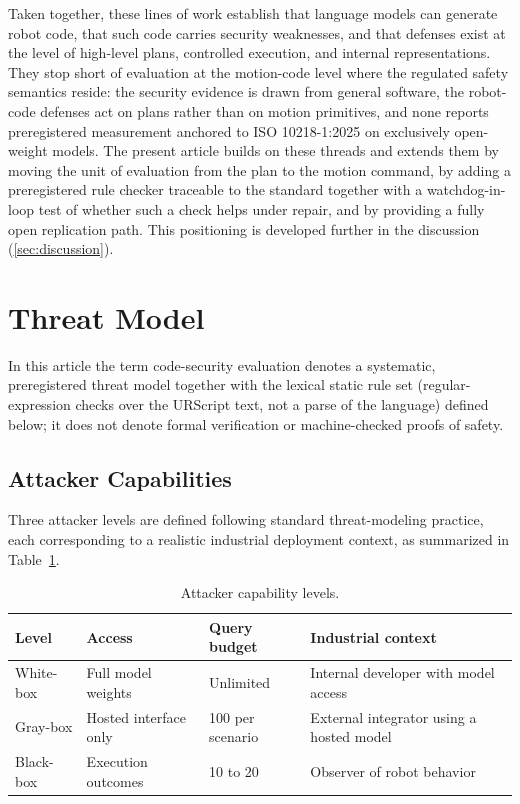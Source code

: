\documentclass{ieeeaccess}
\begin{document}
Taken together, these lines of work establish that language models can generate
robot code, that such code carries security weaknesses, and that defenses exist at
the level of high-level plans, controlled execution, and internal representations.
They stop short of evaluation at the motion-code level where the regulated safety
semantics reside: the security evidence is drawn from general software, the
robot-code defenses act on plans rather than on motion primitives, and none reports
preregistered measurement anchored to ISO 10218-1:2025 on exclusively open-weight
models. The present article builds on these threads and extends them by moving the
unit of evaluation from the plan to the motion command, by adding a preregistered
rule checker traceable to the standard together with a watchdog-in-loop test of
whether such a check helps under repair, and by providing a fully open replication
path. This positioning is developed further in the discussion (\ref{sec:discussion}).

\section{Threat Model}\label{sec:threat}
In this article the term code-security evaluation denotes a systematic,
preregistered threat model together with the lexical static rule set (regular-expression
checks over the URScript text, not a parse of the language) defined
below; it does not denote formal verification or machine-checked proofs of safety.

\subsection{Attacker Capabilities}\label{sec:attacker}
Three attacker levels are defined following standard threat-modeling practice, each
corresponding to a realistic industrial deployment context, as summarized in
Table~\ref{tab:attacker}.

\begin{table}[h]
\caption{Attacker capability levels.}
\label{tab:attacker}
\centering
\footnotesize
\begin{tabular}{@{}p{}p{}p{}p{}@{}}
\toprule
Level & Access & Query budget & Industrial context \\
\midrule
White-box & Full model weights & Unlimited & Internal developer with model access \\
Gray-box & Hosted interface only & 100 per scenario & External integrator using a hosted model \\
Black-box & Execution outcomes & 10 to 20 & Observer of robot behavior \\
\bottomrule
\end{tabular}
\end{table}
\end{document}
